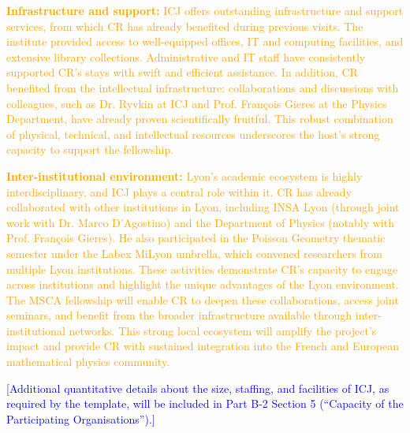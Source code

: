 \documentclass[11pt,draftproposal]{msca-pf}
\begin{document}
\textcolor{orange}{\textbf{Infrastructure and support:} ICJ offers outstanding infrastructure and support services, from which CR has already benefited during previous visits. The institute provided access to well-equipped offices, IT and computing facilities, and extensive library collections. Administrative and IT staff have consistently supported CR’s stays with swift and efficient assistance. In addition, CR benefited from the intellectual infrastructure: collaborations and discussions with colleagues, such as Dr. Ryvkin at ICJ and Prof. François Gieres at the Physics Department, have already proven scientifically fruitful. This robust combination of physical, technical, and intellectual resources underscores the host’s strong capacity to support the fellowship.}

\textcolor{orange}{\textbf{Inter-institutional environment:} Lyon’s academic ecosystem is highly interdisciplinary, and ICJ plays a central role within it. CR has already collaborated with other institutions in Lyon, including INSA Lyon (through joint work with Dr. Marco D’Agostino) and the Department of Physics (notably with Prof. François Gieres). He also participated in the Poisson Geometry thematic semester under the Labex MiLyon umbrella, which convened researchers from multiple Lyon institutions. These activities demonstrate CR’s capacity to engage across institutions and highlight the unique advantages of the Lyon environment. The MSCA fellowship will enable CR to deepen these collaborations, access joint seminars, and benefit from the broader infrastructure available through inter-institutional networks. This strong local ecosystem will amplify the project’s impact and provide CR with sustained integration into the French and European mathematical physics community.}

\textcolor{blue}{[Additional quantitative details about the size, staffing, and facilities of ICJ, as required by the template, will be included in Part B-2 Section 5 (“Capacity of the Participating Organisations”).]}


   







\footnotesize


%



\end{document}
